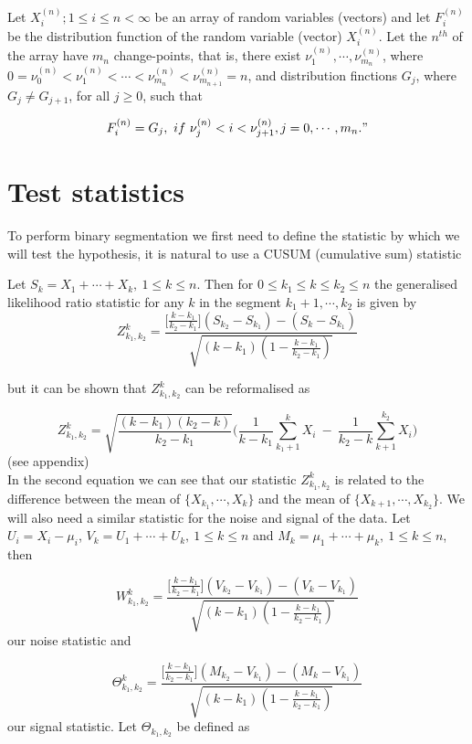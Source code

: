 \documentclass[a4paper, 12pt, notitlepage]{report}
\begin{document}
Let \( {X_i ^{(n)} ;1 \leq i \leq n < \infty} \) be an array of random variables (vectors) and let $F^{(n)}_i$ be the distribution function of the random variable (vector) $X^{(n)}_i$. Let the $n^{th}$ of the array have $m_n$ change-points, that is, there exist \( \nu^{(n)}_1, \cdots, \nu^{(n)}_{m_n} \), where  \(0 =  \nu^{(n)}_0 <  \nu^{(n)}_1 < \cdots < \nu^{(n)}_{m_n} < \nu^{(n)}_{m_{n+1}} = n\), and distribution finctions $G_j$, where \( G_j  \neq G_{j+1}\), for all $j \geq 0$, such that

\[ F^{(n)}_i  = G_j, \ if \ \nu^{(n)}_j < i <  \nu^{(n)}_{j+1}, j = 0, \cdots, m_n."\]

\section{Test statistics}

To perform binary segmentation we first need to define the statistic by which we will test the hypothesis, it is natural to use a CUSUM (cumulative sum) statistic

Let \(S_k = X_1 + \cdots + X_k,\ 1 \leq k \leq n\). Then for \(0 \leq k_1 \leq k \leq k_2 \leq n\) the generalised likelihood ratio statistic for any $k$ in the segment \( {k_1 +1, \cdots, k_2} \) is given by
 \[ Z^k_{k_1, k_2} = \frac{\big [\frac{k - k_1}{k_2 - k_1} \big ](S_{k_2} - S_{k_1}) - (S_k - S_{k_1})}{\sqrt{(k - k_1)(1 - \frac{k - k_1}{k_2 - k_1})}} \]

but it can be shown that \(Z^k_{k_1, k_2}\) can be reformalised as

\[Z^k_{k_1, k_2} = \sqrt{\frac{(k - k_1)(k_2 - k)}{k_2 -k_1}}\Big (\frac{1}{k - k_1}\sum^k_{k_1+1} X_i \ - \ \frac{1}{k_2 - k}\sum^{k_2}_{k+1} X_i \Big ) \] \footnotesize(see appendix)\\

In the second equation we can see that our statistic \(Z^k_{k_1, k_2}\) is related to the difference between the mean of \(\{X_{k_1}, \cdots, X_k\}\) and the mean of \(\{X_{k+1}, \cdots, X_{k_2}\}\). We will also need a similar statistic for the noise and signal of the data. Let \(U_i  = X_i - \mu_i\), \(V_k=  U_1+ \cdots + U_k,\ 1 \leq k \leq n \) and \(M_k =   \mu_1+ \cdots + \mu_k,\ 1 \leq k \leq n\), then

\[W^k_{k_1, k_2} = \frac{\big [\frac{k - k_1}{k_2 - k_1} \big ](V_{k_2} - V_{k_1}) - (V_k - V_{k_1})}{\sqrt{(k - k_1)(1 - \frac{k - k_1}{k_2 - k_1})}} \]
our noise statistic and

\[\Theta^k_{k_1, k_2} = \frac{\big [\frac{k - k_1}{k_2 - k_1} \big ](M_{k_2} - V_{k_1}) - (M_k - V_{k_1})}{\sqrt{(k - k_1)(1 - \frac{k - k_1}{k_2 - k_1})}} \]
our signal statistic.
Let \(\Theta_{k_1, k_2}\) be defined as
\end{document}
